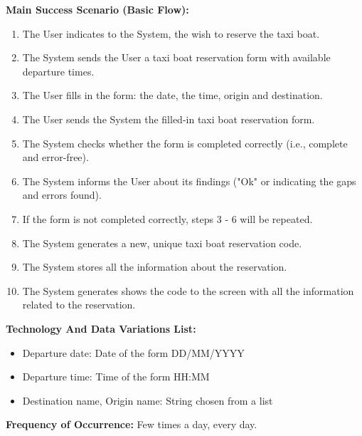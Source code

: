 \textbf{Main Success Scenario (Basic Flow):}
\begin{enumerate}
\item The User indicates to the System, the wish to reserve the taxi boat.
\item The System sends the User a taxi boat reservation form with available departure times.
\item The User fills in the form: the date, the time, origin and destination.
\item The User sends the System the filled-in taxi boat reservation form.
\item The System checks whether the form is completed correctly (i.e., complete and error-free).
\item The System informs the User about its findings ("Ok" or indicating the gaps and errors found).
\item If the form is not completed correctly, steps 3 - 6 will be repeated.
\item The System generates a new, unique taxi boat reservation code.
\item The System stores all the information about the reservation.
\item The System generates shows the code to the screen with all the information related to the reservation.
\end{enumerate}

\textbf{Technology And Data Variations List:} 
\begin{itemize}
    \item Departure date: Date of the form DD/MM/YYYY
    \item Departure time: Time of the form HH:MM
    \item Destination name, Origin name: String chosen from a list
    \end{itemize}

\textbf{Frequency of Occurrence:} Few times a day, every day.

